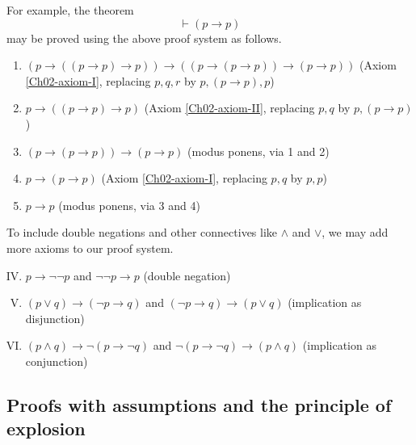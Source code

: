 For example, the theorem
%
\[\vdash (p \rightarrow p)\]
%
may be proved using the above proof system as follows.
%
\begin{enumerate}
    \item \((p \rightarrow ((p \rightarrow p) \rightarrow p)) \rightarrow ((p \rightarrow (p \rightarrow p)) \rightarrow (p \rightarrow p))\)
    \hfill (Axiom \ref{Ch02-axiom-I}, replacing \(p, q, r\) by \(p, (p \rightarrow p), p\))

    \item \(p \rightarrow ((p \rightarrow p) \rightarrow p)\)
    \hfill (Axiom \ref{Ch02-axiom-II}, replacing \(p, q\) by \(p, (p \rightarrow p)\))

    \item \((p \rightarrow (p \rightarrow p)) \rightarrow (p \rightarrow p)\)
    \hfill (modus ponens, via 1 and 2)

    \item \(p \rightarrow (p \rightarrow p)\)
    \hfill (Axiom \ref{Ch02-axiom-I}, replacing \(p, q\) by \(p, p\))

    \item \(p \rightarrow p\)
    \hfill (modus ponens, via 3 and 4)
\end{enumerate}



To include double negations and other connectives like \(\land\) and \(\lor\), we may add more axioms to our proof system.
%
\begin{enumerate}[I.]
    \setcounter{enumi}{3}
    \item \(p \rightarrow \neg\neg p\) and \(\neg\neg p \rightarrow p\)
    \hfill (double negation)
    \label{Ch02-axiom-IV}
    
    \item \((p \lor q) \rightarrow (\neg p \rightarrow q)\) and \((\neg p \rightarrow q) \rightarrow (p \lor q)\)
    \hfill (implication as disjunction)
    \label{Ch02-axiom-V}
    
    \item \((p \land q) \rightarrow \neg(p \rightarrow \neg q)\) and \(\neg(p \rightarrow \neg q) \rightarrow (p \land q)\)
    \hfill (implication as conjunction)
    \label{Ch02-axiom-VI}
\end{enumerate}



\subsection{Proofs with assumptions and the principle of explosion}

